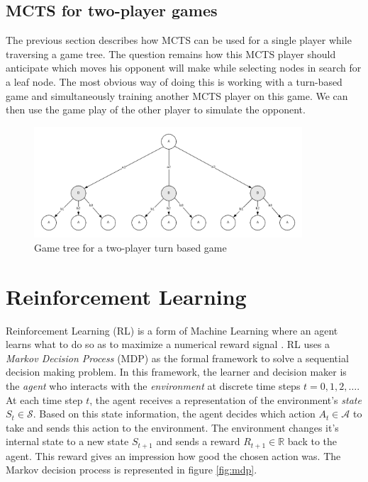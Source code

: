 \subsection{MCTS for two-player games}
The previous section describes how MCTS can be used for a single player while traversing a game tree. The question remains how this MCTS player should anticipate which moves his opponent will make while selecting nodes in search for a leaf node. The most obvious way of doing this is working with a turn-based game and simultaneously training another MCTS player on this game. We can then use the game play of the other player to simulate the opponent. 

\begin{figure}[htp]
    \centering
    \includegraphics[width=10cm]{images/game_tree.png}
    \caption{Game tree for a two-player turn based game}
    \label{fig:game_tree}
\end{figure}

\section{Reinforcement Learning}
\label{sec:intro_rl}
Reinforcement Learning (RL) is a form of Machine Learning where an agent learns what to do so as to maximize a numerical reward signal \cite{sutton2018reinforcement}. RL uses a \emph{Markov Decision Process} (MDP) as the formal framework to solve a sequential decision making problem. In this framework, the learner and decision maker is the \emph{agent} who interacts with the \emph{environment} at discrete time steps $t=0, 1, 2, \ldots$. At each time step $t$, the agent receives a representation of the environment's \emph{state} $S_t \in \mathcal{S}$. Based on this state information, the agent decides which action $A_t \in \mathcal{A}$ to take and sends this action to the environment. The environment changes it's internal state to a new state $S_{t+1}$ and sends a reward $R_{t+1} \in \mathbb{R}$ back to the agent. This reward gives an impression how good the chosen action was. The Markov decision process is represented in figure \ref{fig:mdp}.

